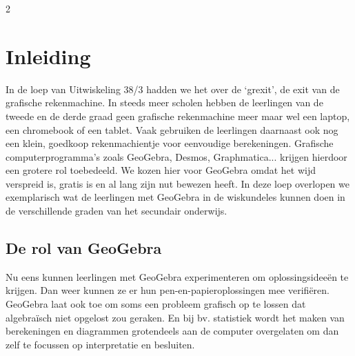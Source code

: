 


\startcontents[inhoudloep]	%

\begin{multicols}{2}
	
	\inhoudstafelloep			%
	

 \section{Inleiding}

 In de loep van Uitwiskeling 38/3 hadden we het over de `grexit', de exit van de grafische rekenmachine. In steeds meer scholen hebben de leerlingen van de tweede en de derde graad geen grafische rekenmachine meer maar wel een laptop, een chromebook of een tablet. Vaak gebruiken de leerlingen daarnaast ook nog een klein, goedkoop rekenmachientje voor eenvoudige berekeningen.  Grafische computerprogramma's zoals GeoGebra, Desmos, Graphmatica... krijgen hierdoor een grotere rol toebedeeld. We kozen hier voor GeoGebra omdat het wijd verspreid is, gratis is en al lang zijn nut bewezen heeft. In deze loep overlopen we exemplarisch wat de leerlingen met GeoGebra in de wiskundeles kunnen doen in de verschillende graden van het secundair onderwijs.

 \subsection*{De rol van GeoGebra}

 Nu eens kunnen leerlingen met GeoGebra experimenteren om oplossingsideeën te krijgen. Dan weer kunnen ze er hun pen-en-papieroplossingen mee verifiëren. GeoGebra laat ook toe om soms een probleem grafisch op te lossen dat algebraïsch niet opgelost zou geraken. En bij bv. statistiek wordt het maken van berekeningen en diagrammen grotendeels aan de computer overgelaten om dan zelf te focussen op interpretatie en besluiten.


\end{multicols}
